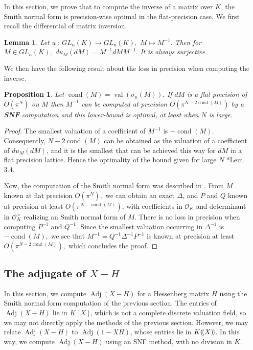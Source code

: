 \documentclass[sigconf]{acmart}
\DeclareMathOperator{\val}{val}
\DeclareMathOperator{\adj}{Adj}
\DeclareMathOperator{\cond}{cond}
\newcommand{\OK}{\mathcal{O}_K}
\newcommand{\llp}{(\mkern-2.5mu(}
\newcommand{\rrp}{)\mkern-2.5mu)}
\newtheorem{lem}[theo]{Lemma}
\newtheorem{prop}[theo]{Proposition}
\theoremstyle{definition}
\begin{document}
In this section, we prove that to compute the inverse of
a matrix over $K$, the Smith normal form is precision-wise optimal in the flat-precision case.
We first recall the differential of matrix inversion.

\begin{lem}
Let $u \: : \: GL_n (K) \rightarrow GL_n(K),$ $M \mapsto M^{-1}.$
Then for $M \in GL_n (K),$ $du_M(dM)=M^{-1} dM M^{-1}.$
It is always surjective.
\end{lem}

We then have the following result about the loss in precision when computing the inverse.

\begin{prop}
Let $\cond(M) = \val(\sigma_n(M))$.
If $dM$ is a flat precision of $O(\pi^N)$ on $M$ then $M^{-1}$
can be computed at precision $O(\pi^{N-2\cond(M)})$ by a \textbf{SNF} computation
and this lower-bound is optimal,
at least when $N$ is large.
\end{prop}

\begin{proof}
The smallest valuation of a coefficient of $M^{-1}$ is $-\cond(M)$.
Consequently, $N - 2\cond(M)$
can be obtained as the valuation of a coefficient of $du_M(dM)$,
and it is the smallest that can be achieved this way for $dM$ in a flat precision lattice.
Hence the optimality of the bound given for large 
$N$ \cite{caruso-roe-vaccon:14a}*{Lem. 3.4}.

Now, the computation of the Smith normal form was described in \cite{Vaccon-these}.
From $M$ known at flat precision $O(\pi^N),$ we can obtain an exact $\Delta$, and $P$ and $Q$ 
known at precision at least $O(\pi^{N-\cond(M)})$, with coefficients in $\OK$
and determinant in $\OK^\times$ realizing an Smith normal form of $M.$
There is no loss in precision when computing $P^{-1}$ and $Q^{-1}.$
Since the smallest valuation occurring in $\Delta^{-1}$ is $-\cond(M),$
we see that $M^{-1}=Q^{-1} \Delta^{-1} P^{-1}$ is known at precision at least $O(\pi^{N-2\cond(M)}),$
which concludes the proof.
\end{proof}

\subsection{The adjugate of $X{-}H$}

In this section, we compute $\adj(X-H)$ for a Hessenberg matrix $H$
using the Smith normal form computation of the previous section.
The entries of $\adj(X-H)$ lie in $K[X]$, which is not a complete
discrete valuation field,
so we may not directly apply the methods of the previous section.
However, we may relate $\adj(X-H)$ to $\adj(1-XH)$, whose
entries lie in $K\llp X\rrp$.  In this way, we compute $\adj(X-H)$
using an SNF method, with no division in $K$.
\end{document}
